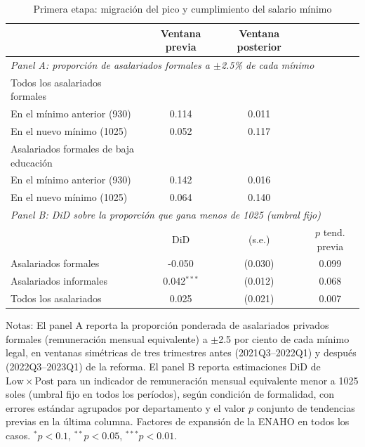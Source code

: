 \begin{table}[!tbp]\centering
\caption{Primera etapa: migración del pico y cumplimiento del salario mínimo}\label{tab:firststage}
\begin{threeparttable}
\footnotesize
\begin{tabular}{lccc}
\toprule
  & Ventana previa & Ventana posterior & \\
\midrule
\multicolumn{4}{l}{\emph{Panel A: proporción de asalariados formales a $\pm$2.5\% de cada mínimo}} \\
Todos los asalariados formales & & & \\
\quad En el mínimo anterior (930) & 0.114 & 0.011 & \\
\quad En el nuevo mínimo (1025) & 0.052 & 0.117 & \\
Asalariados formales de baja educación & & & \\
\quad En el mínimo anterior (930) & 0.142 & 0.016 & \\
\quad En el nuevo mínimo (1025) & 0.064 & 0.140 & \\
\midrule
\multicolumn{4}{l}{\emph{Panel B: DiD sobre la proporción que gana menos de 1025 (umbral fijo)}} \\
 & DiD & (s.e.) & $p$ tend. previa \\ \midrule
Asalariados formales & -0.050 & (0.030) & 0.099 \\
Asalariados informales & 0.042$^{***}$ & (0.012) & 0.068 \\
Todos los asalariados & 0.025 & (0.021) & 0.007 \\
\bottomrule
\end{tabular}
\begin{tablenotes}\footnotesize
\item Notas: El panel A reporta la proporción ponderada de asalariados privados formales (remuneración mensual equivalente) a $\pm$2.5 por ciento de cada mínimo legal, en ventanas simétricas de tres trimestres antes (2021Q3--2022Q1) y después (2022Q3--2023Q1) de la reforma. El panel B reporta estimaciones DiD de $\mathrm{Low}\times\mathrm{Post}$ para un indicador de remuneración mensual equivalente menor a 1025 soles (umbral fijo en todos los períodos), según condición de formalidad, con errores estándar agrupados por departamento y el valor $p$ conjunto de tendencias previas en la última columna. Factores de expansión de la ENAHO en todos los casos. $^{*}p<0.1$, $^{**}p<0.05$, $^{***}p<0.01$.
\end{tablenotes}
\end{threeparttable}\end{table}
